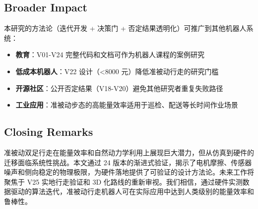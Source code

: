 \subsection{Broader Impact}

本研究的方法论（迭代开发 + 决策门 + 否定结果透明化）可推广到其他机器人系统：

\begin{itemize}
    \item \textbf{教育}：V01-V24 完整代码和文档可作为机器人课程的案例研究
    \item \textbf{低成本机器人}：V22 设计（<8000 元）降低准被动行走的研究门槛
    \item \textbf{开源社区}：公开否定结果（V18-V20）避免其他研究者重复失败路径
    \item \textbf{工业应用}：准被动步态的高能量效率适用于巡检、配送等长时间作业场景
\end{itemize}

\subsection{Closing Remarks}

准被动双足行走在能量效率和自然动力学利用上展现巨大潜力，但从仿真到硬件的迁移面临系统性挑战。本文通过 24 版本的渐进式验证，揭示了电机摩擦、传感器噪声和侧向稳定的物理极限，为硬件落地提供了可验证的设计方法论。未来工作将聚焦于 V25 实地行走验证和 3D 化路线的重新审视。我们相信，通过硬件实测数据驱动的算法迭代，准被动行走机器人可在实际应用中达到人类级别的能量效率和鲁棒性。

